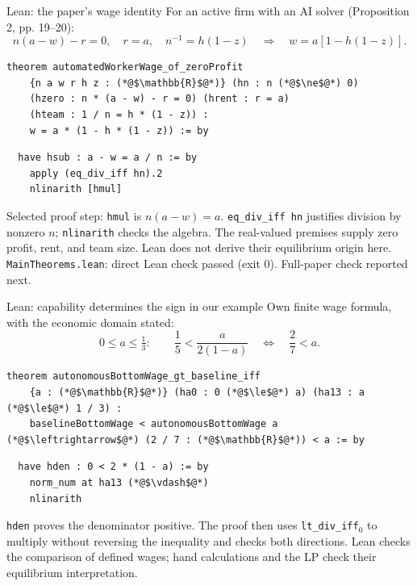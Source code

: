 \begin{frame}[fragile]{Lean: the paper's wage identity}
\small
For an active firm with an AI solver (Proposition 2, pp. 19--20):
\[
n(a-w)-r=0,\quad r=a,\quad n^{-1}=h(1-z)
\quad\Longrightarrow\quad w=a[1-h(1-z)].
\]
\begin{lstlisting}
theorem automatedWorkerWage_of_zeroProfit
    {n a w r h z : (*@$\mathbb{R}$@*)} (hn : n (*@$\ne$@*) 0)
    (hzero : n * (a - w) - r = 0) (hrent : r = a)
    (hteam : 1 / n = h * (1 - z)) :
    w = a * (1 - h * (1 - z)) := by
\end{lstlisting}
\vspace{-1mm}
\begin{lstlisting}
  have hsub : a - w = a / n := by
    apply (eq_div_iff hn).2
    nlinarith [hmul]
\end{lstlisting}
\footnotesize
Selected proof step: \texttt{hmul} is $n(a-w)=a$.
\texttt{eq\_div\_iff hn} justifies division by nonzero $n$; \texttt{nlinarith} checks the algebra.
The real-valued premises supply zero profit, rent, and team size. Lean does not derive their equilibrium origin here.
\vfill\scriptsize \texttt{MainTheorems.lean}: direct Lean check passed (exit 0). Full-paper check reported next.
\end{frame}

\begin{frame}[fragile]{Lean: capability determines the sign in our example}
\small
Own finite wage formula, with the economic domain stated:
\[
0\le a\le\tfrac13:\qquad
\frac15<\frac{a}{2(1-a)}\quad\Longleftrightarrow\quad\frac27<a.
\]
\begin{lstlisting}
theorem autonomousBottomWage_gt_baseline_iff
    {a : (*@$\mathbb{R}$@*)} (ha0 : 0 (*@$\le$@*) a) (ha13 : a (*@$\le$@*) 1 / 3) :
    baselineBottomWage < autonomousBottomWage a (*@$\leftrightarrow$@*) (2 / 7 : (*@$\mathbb{R}$@*)) < a := by
\end{lstlisting}
\begin{lstlisting}
  have hden : 0 < 2 * (1 - a) := by
    norm_num at ha13 (*@$\vdash$@*)
    nlinarith
\end{lstlisting}
\footnotesize
\texttt{hden} proves the denominator positive. The proof then uses
\texttt{lt\_div\_iff}$_0$ to multiply without reversing the inequality and checks both directions.
Lean checks the comparison of defined wages; hand calculations and the LP check their equilibrium interpretation.
\vfill
\end{frame}
